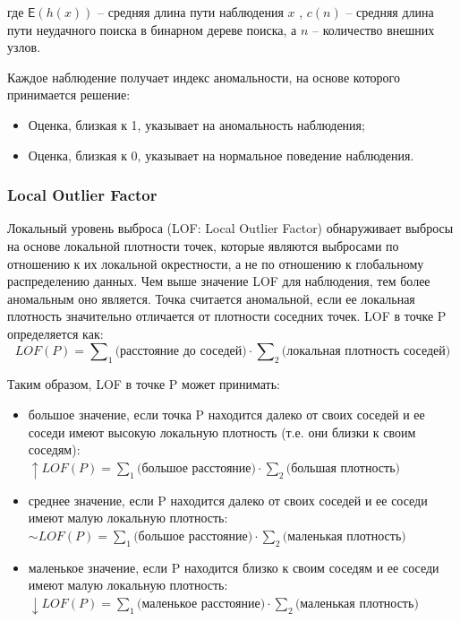 \documentclass[12pt]{article}
\begin{document}
    \noindent где $\mathsf{E}(h(x))$ -- средняя длина пути наблюдения $x$ , $c(n)$ -- средняя длина пути неудачного поиска в бинарном дереве поиска, а $n$ -- количество внешних узлов.

    \par Каждое наблюдение получает индекс аномальности, на основе которого принимается решение:
    \begin{itemize}
        \item Оценка, близкая к 1, указывает на аномальность наблюдения;
        \item Оценка, близкая к 0, указывает на нормальное поведение наблюдения.
    \end{itemize}


    \subsubsection{Local Outlier Factor}
    \label{sec:Research:Model:LocalOutlierFactor}

    \par Локальный уровень выброса (LOF: Local Outlier Factor) \cite{LOF} обнаруживает выбросы на основе локальной плотности точек, которые являются выбросами по отношению к их локальной окрестности, а не по отношению к глобальному распределению данных. Чем выше значение LOF для наблюдения, тем более аномальным оно является. Точка считается аномальной, если ее локальная плотность значительно отличается от плотности соседних точек. LOF в точке P определяется как:
    \begin{equation}
    \label{sec:Research:Model:LocalOutlierFactor:formula:LOF}
        LOF(P) = \sum\nolimits_1 \text{(расстояние до соседей)} \cdot \sum\nolimits_2 \text{(локальная плотность соседей)}
    \end{equation}

    \noindent Таким образом, LOF в точке P может принимать:

    \begin{itemize}
        \item большое значение, если точка P находится далеко от своих соседей и ее соседи имеют высокую локальную плотность (т.е. они близки к своим соседям): \\ 
        $ \uparrow LOF(P) = \sum_1 {\text{(большое расстояние)}} \cdot \sum_2 \text{(большая плотность)} $
        \item среднее значение, если P находится далеко от своих соседей и ее соседи имеют малую локальную плотность: \\
        $ \sim LOF(P) = \sum_1 \text{(большое расстояние)} \cdot \sum_2 \text{(маленькая плотность)} $
        \item маленькое значение, если P находится близко к своим соседям и ее соседи имеют малую локальную плотность: \\
        $ \downarrow LOF(P) = \sum_1 \text{(маленькое расстояние)} \cdot \sum_2 \text{(маленькая плотность)} $
    \end{itemize}
\end{document}
